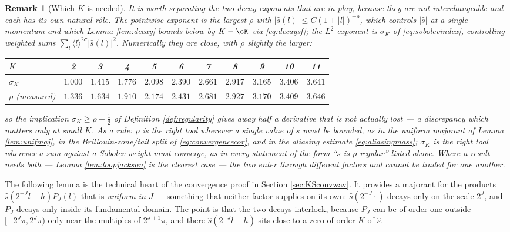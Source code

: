 \documentclass[a4paper, 11pt]{article}
\DeclareMathOperator{\1}{\mathds{1}}
\newtheorem{rem}[thm]{Remark}
\begin{document}
\begin{rem}[Which $K$ is needed]
It is worth separating the \emph{two} decay exponents that are in play, because they are not interchangeable and each has its own natural r\^ole. The \emph{pointwise} exponent is the largest $\rho$ with $|\hat{s}(l)|\leq C(1+|l|)^{-\rho}$, which controls $|\hat{s}|$ at a single momentum and which Lemma \ref{lem:decay} bounds below by $K-\cK$ via \eqref{eq:decaysf}; the \emph{$L^{2}$} exponent is $\sigma_{K}$ of \eqref{eq:sobolevindex}, controlling weighted sums $\sum_{l}\langle l\rangle^{2\sigma}|\hat{s}(l)|^{2}$. Numerically they are close, with $\rho$ slightly the larger:
\begin{center}
\begin{tabular}{l|cccccccccc}
$K$ & 2 & 3 & 4 & 5 & 6 & 7 & 8 & 9 & 10 & 11 \\ \hline
$\sigma_{K}$ & $1.000$ & $1.415$ & $1.776$ & $2.098$ & $2.390$ & $2.661$ & $2.917$ & $3.165$ & $3.406$ & $3.641$ \\
$\rho$ (measured) & $1.336$ & $1.634$ & $1.910$ & $2.174$ & $2.431$ & $2.681$ & $2.927$ & $3.170$ & $3.409$ & $3.646$
\end{tabular}
\end{center}
so the implication $\sigma_{K}\geq\rho-\tfrac{1}{2}$ of Definition \ref{def:regularity} gives away half a derivative that is not actually lost --- a discrepancy which matters only at small $K$. As a rule: $\rho$ is the right tool wherever a single value of $\hat{s}$ must be bounded, as in the uniform majorant of Lemma \ref{lem:unifmaj}, in the Brillouin-zone/tail split of \eqref{eq:convergencecor}, and in the aliasing estimate \eqref{eq:aliasingmass}; $\sigma_{K}$ is the right tool wherever a sum against a Sobolev weight must converge, as in every statement of the form ``$s$ is $\rho$-regular'' listed above. Where a result needs both --- Lemma \ref{lem:loopjackson} is the clearest case --- the two enter through different factors and cannot be traded for one another.
\end{rem}

The following lemma is the technical heart of the convergence proof in Section \ref{sec:KSconvwav}. It provides a majorant for the products $\hat{s}(2^{-J}l-h)P_{J}(l)$ that is \emph{uniform in $J$} --- something that neither factor supplies on its own: $\hat{s}(2^{-J}\cdot)$ decays only on the scale $2^{J}$, and $P_{J}$ decays only inside its fundamental domain. The point is that the two decays interlock, because $P_{J}$ can be of order one outside $[-2^{J}\pi,2^{J}\pi)$ only near the multiples of $2^{J+1}\pi$, and there $\hat{s}(2^{-J}l-h)$ sits close to a zero of order $K$ of $\hat{s}$.
\end{document}
